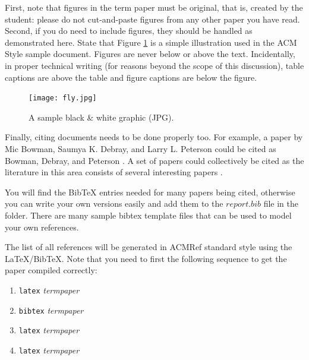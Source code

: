\documentclass{sig-alternate}
\begin{document}
First, note that figures in the term paper must be original,
that is, created by the student: please do not cut-and-paste
figures from any other paper you have read. Second, if you
do need to include figures, they should be handled as
demonstrated here. State that Figure \ref{sample graphic} is
a simple illustration used in the ACM Style sample
document. Figures are never below or above the
text. Incidentally, in proper technical writing (for reasons
beyond the scope of this discussion), table captions are
above the table and figure captions are below the figure.

\begin{figure}[htb]
\label{sample graphic}
\begin{center}
\texttt{[image: fly.jpg]}
\caption{A sample black \& white graphic (JPG).}
\end{center}
\end{figure}

Finally, citing documents needs to be done properly too. For
example, a paper by Mic Bowman, Saumya K. Debray, and Larry
L. Peterson could be cited as Bowman, Debray, and Peterson
\cite{bowman:reasoning}. A set of papers could collectively
be cited as the literature in this area consists of several
interesting papers
\cite{braams:babel,clark:pct,herlihy:methodology}.

You will find the BibTeX entries needed for many papers being cited,
otherwise you can write your own versions easily and add them to the
$report.bib$ file in the folder. There are many sample bibtex
template files that can be used to model your own references.

The list of all references will be generated in ACMRef
standard style using the \LaTeX{}/BibTeX. Note that you
need to first the following sequence to get the paper
compiled correctly:

\begin{enumerate}
\item {\tt latex} {\em termpaper}
\item {\tt bibtex} {\em termpaper}
\item {\tt latex} {\em termpaper}
\item {\tt latex} {\em termpaper}
\end{enumerate}



\balance
\end{document}
